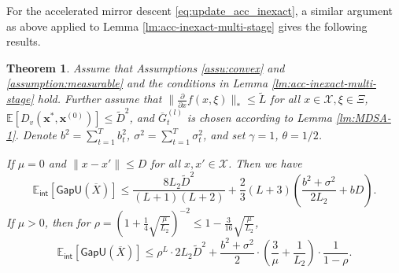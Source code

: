 \documentclass[11pt,fullpage,letterpaper]{article}
\newcommand{\mc}{\mathcal}
\newcommand{\mb}{\mathbf}
\newcommand{\E}{\mathbb{E}}
\newcommand{\internal}{\mathsf{int}}
\newcommand{\gapu}{\mathsf{GapU}}
\newtheorem{theorem}{Theorem}[section]
\begin{document}
For the accelerated mirror descent \eqref{eq:update_acc_inexact}, a similar argument as above applied to Lemma \ref{lm:acc-inexact-multi-stage} gives the following results.
\begin{theorem}\label{thm:acc-mu}
    Assume that Assumptions \ref{assu:convex} and \ref{assumption:measurable} and the conditions in Lemma \ref{lm:acc-inexact-multi-stage} hold. Further assume that $\|\frac{\partial}{\partial x}f(x,\xi)\|_*\leq \tilde{L}$ for all $x\in \mc X,\xi \in \Xi$, $\E[D_{v}(\mb x^*,\mb x^{(0)})]\leq \tilde{D}^2$, and $\overline{G}_t^{(l)}$ is chosen according to Lemma \ref{lm:MDSA-1}. Denote $b^2 = \sum_{t=1}^T b_t^2$, $\sigma^2 = \sum_{t=1}^T \sigma_t^2$, and set $\gamma = 1$, $\theta=1/2$. 

    If $\mu =0$ and $\|x-x'\|\leq D$ for all $x,x'\in \mc X$. Then we have 
\begin{equation}\label{eq:acc-1}
    \E_{\internal}[\gapu(\overline{X})]\leq \frac{8L_2 \tilde{D}^2}{(L+1)(L+2)} + \frac{2}{3}(L+3) (\frac{b^2+\sigma^2}{2L_2}+ bD).
\end{equation}
If $\mu>0$, then for $\rho =  (1+\frac{1}{4}\sqrt{\frac{\mu}{L_2}})^{-2}\leq 1-\frac{3}{16}\sqrt{\frac{\mu}{L_2}}$, 
\begin{equation}\label{eq:acc-2}
    \E_{\internal}[\gapu(\overline{X})]\leq \rho^L\cdot 2L_2 \tilde{D}^2 + \frac{b^2+\sigma^2}{2}\cdot (\frac{3}{\mu} + \frac{1}{L_2})\cdot\frac{1}{1-\rho}.
\end{equation}
\end{theorem}
\end{document}
